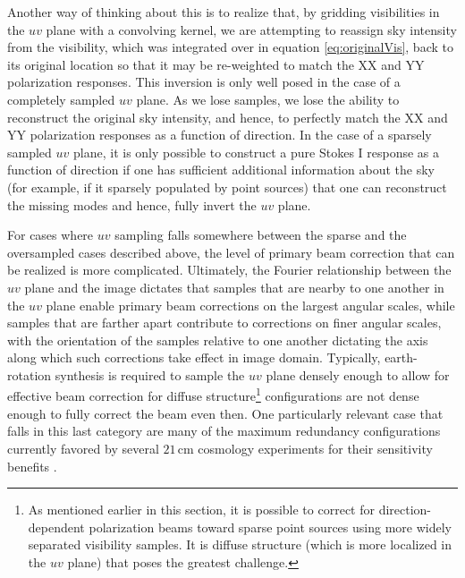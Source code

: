 \documentclass[twocolumn,apj,numberedappendix]{emulateapj}
\begin{document}
Another way of thinking about this is to realize that, by gridding visibilities
in the $uv$ plane with a convolving kernel, we are attempting to reassign sky
intensity from the visibility, which was integrated over in equation \ref{eq:originalVis}, back to
its original location so that it may be re-weighted to match the XX and YY
polarization responses.  This inversion is only well posed in the case of a
completely sampled $uv$ plane.  As we lose samples, we lose the ability to
reconstruct the original sky intensity, and hence, to perfectly match the XX
and YY polarization responses as a function of direction.  In the case of a
sparsely sampled $uv$ plane, it is only possible to construct a pure Stokes I
response as a function of direction if one has sufficient additional
information about the sky (for example, if it sparsely populated by point
sources) that one can reconstruct the missing modes and hence, fully invert the
$uv$ plane.

For cases where $uv$ sampling falls somewhere between the sparse and the oversampled cases described above, the level
of primary beam correction that can be realized is more complicated.  Ultimately, the Fourier relationship between
the $uv$ plane and the image dictates that samples that are nearby to one
another in the $uv$ plane enable primary beam corrections on the largest angular scales, while samples that are farther
apart contribute to corrections on finer angular scales, with the orientation of the samples relative to one another
dictating the axis along which such corrections take effect in image domain.  Typically, earth-rotation synthesis
is required to sample the $uv$ plane densely enough to allow for effective beam correction for
diffuse structure\footnote{
As mentioned earlier in this section, it is possible to correct for direction-dependent polarization beams toward
sparse point sources using more widely separated visibility samples.  It is diffuse structure (which
is more localized in the $uv$ plane) that poses the greatest challenge.}
configurations are not dense enough to fully correct the beam even then.  One particularly relevant case that falls
in this last category are many of the maximum redundancy configurations currently favored by several $21\,\textrm{cm}$ cosmology experiments
for their sensitivity benefits \citep{parsons_et_al2012a,P14}.
\end{document}
